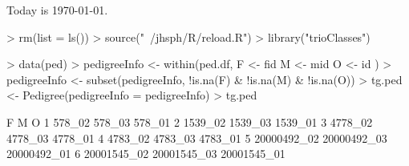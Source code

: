 \documentclass[10pt]{article}
\begin{document}
\setlength{\parskip}{0.2\baselineskip}
\setlength{\parindent}{0pt}
Today is \today.
\begin{Schunk}
\begin{Sinput}
> rm(list = ls())
> source("~/jhsph/R/reload.R")
> library("trioClasses")
\end{Sinput}
\end{Schunk}
\begin{Schunk}
\begin{Sinput}
> data(ped)
> pedigreeInfo <- within(ped.df, {
     F <- fid
     M <- mid
     O <- id
 })
> pedigreeInfo <- subset(pedigreeInfo, !is.na(F) & !is.na(M) & 
     !is.na(O))
> tg.ped <- Pedigree(pedigreeInfo = pedigreeInfo)
> tg.ped
\end{Sinput}
\begin{Soutput}
            F           M           O
1      578_02      578_03      578_01
2     1539_02     1539_03     1539_01
3     4778_02     4778_03     4778_01
4     4783_02     4783_03     4783_01
5 20000492_02 20000492_03 20000492_01
6 20001545_02 20001545_03 20001545_01
\end{Soutput}
\end{Schunk}
\end{document}
